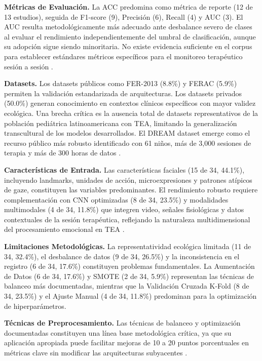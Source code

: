 \documentclass[ASNA,twocolumn]{USG}
\begin{document}
	\textbf{Métricas de Evaluación.} La ACC predomina como métrica de reporte (12 de
	13 estudios), seguida de F1-score (9), Precisión (6), Recall (4) y AUC (3). El AUC
	resulta metodológicamente más adecuado ante desbalance severo de clases al evaluar
	el rendimiento independientemente del umbral de clasificación, aunque su adopción
	sigue siendo minoritaria. No existe evidencia suficiente en el corpus para
	establecer estándares métricos específicos para el monitoreo terapéutico sesión a
	sesión \cite{Radocaj2025}.
	
	\textbf{Datasets.} Los datasets públicos como FER-2013 (8.8\%) y FERAC (5.9\%)
	permiten la validación estandarizada de arquitecturas. Los datasets privados
	(50.0\%) generan conocimiento en contextos clínicos específicos con mayor validez
	ecológica. Una brecha crítica es la ausencia total de datasets representativos de
	la población pediátrica latinoamericana con TEA, limitando la generalización
	transcultural de los modelos desarrollados. El DREAM dataset emerge como el recurso
	público más robusto identificado con 61 niños, más de 3{,}000 sesiones de terapia
	y más de 300 horas de datos \cite{Hassan2025}.
	
	\textbf{Características de Entrada.} Las características faciales (15 de 34,
	44.1\%), incluyendo landmarks, unidades de acción, microexpresiones y patrones
	atípicos de gaze, constituyen las variables predominantes. El rendimiento robusto
	requiere complementación con CNN optimizadas (8 de 34, 23.5\%) y modalidades
	multimodales (4 de 34, 11.8\%) que integren video, señales fisiológicas y datos
	contextuales de la sesión terapéutica, reflejando la naturaleza multidimensional
	del procesamiento emocional en TEA \cite{Sariyanidi2025,Leo2018}.
	
	\textbf{Limitaciones Metodológicas.} La representatividad ecológica limitada
	(11 de 34, 32.4\%), el desbalance de datos (9 de 34, 26.5\%) y la inconsistencia
	en el registro (6 de 34, 17.6\%) constituyen problemas fundamentales. La
	Aumentación de Datos (6 de 34, 17.6\%) y SMOTE (2 de 34, 5.9\%) representan las
	técnicas de balanceo más documentadas, mientras que la Validación Cruzada K-Fold
	(8 de 34, 23.5\%) y el Ajuste Manual (4 de 34, 11.8\%) predominan para la
	optimización de hiperparámetros.
	
	\textbf{Técnicas de Preprocesamiento.} Las técnicas de balanceo y optimización
	documentadas constituyen una línea base metodológica crítica, ya que su aplicación
	apropiada puede facilitar mejoras de 10 a 20 puntos porcentuales en métricas clave
	sin modificar las arquitecturas subyacentes \cite{Alam2025}.
	
\end{document}
